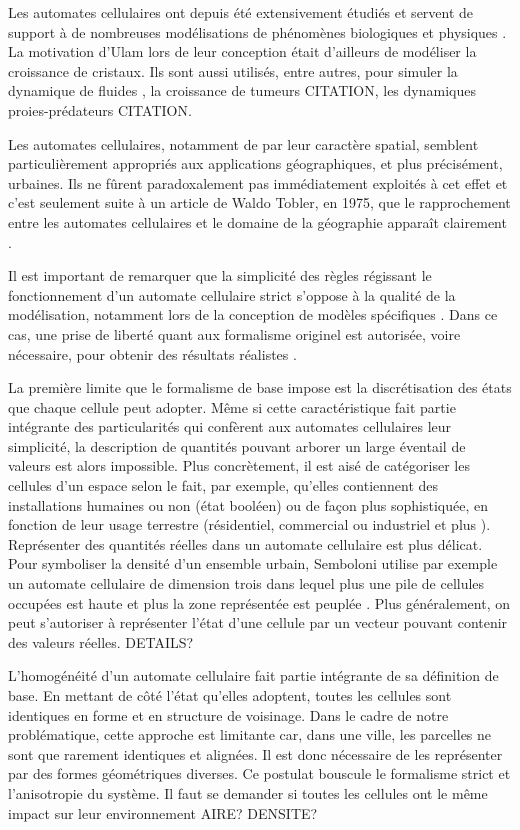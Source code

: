 \documentclass[10pt]{article}
\begin{document}
\begin{multicols}{2}
Les automates cellulaires ont depuis été extensivement étudiés et
servent de support à de nombreuses modélisations de phénomènes
biologiques et physiques \cite{Ganguly}. La motivation d'Ulam lors de
leur conception était d'ailleurs de modéliser la croissance de
cristaux. Ils sont aussi utilisés, entre autres, pour simuler la
dynamique de fluides \cite{Frisch1986}, la croissance de tumeurs
CITATION, les dynamiques proies-prédateurs CITATION.

Les automates cellulaires, notamment de par leur caractère spatial,
semblent particulièrement appropriés aux applications géographiques,
et plus précisément, urbaines. Ils ne fûrent paradoxalement pas
immédiatement exploités à cet effet et c'est seulement suite à un
article de Waldo Tobler, en 1975, que le rapprochement entre les
automates cellulaires et le domaine de la géographie apparaît
clairement \cite{Tobler1975}.

Il est important de remarquer que la simplicité des règles régissant
le fonctionnement d'un automate cellulaire strict s'oppose à la
qualité de la modélisation, notamment lors de la conception de modèles
spécifiques \cite{Torrens2001}. Dans ce cas, une prise de liberté
quant aux formalisme originel est autorisée, voire nécessaire, pour
obtenir des résultats réalistes \cite{White1998}.

La première limite que le formalisme de base impose est la
discrétisation des états que chaque cellule peut adopter. Même si
cette caractéristique fait partie intégrante des particularités qui
confèrent aux automates cellulaires leur simplicité, la description de
quantités pouvant arborer un large éventail de valeurs est alors
impossible. Plus concrètement, il est aisé de catégoriser les cellules
d'un espace selon le fait, par exemple, qu'elles contiennent des
installations humaines ou non (état booléen)
\cite{Benguigui2004,Cornu} ou de façon plus sophistiquée, en fonction
de leur usage terrestre (résidentiel, commercial ou industriel
\cite{Lechner} et plus \cite{Dubos-Paillard203}). Représenter des
quantités réelles dans un automate cellulaire est plus délicat. Pour
symboliser la densité d'un ensemble urbain, Semboloni utilise par
exemple un automate cellulaire de dimension trois dans lequel plus une
pile de cellules occupées est haute et plus la zone représentée est
peuplée \cite{Semboloni2000}. Plus généralement, on peut s'autoriser à
représenter l'état d'une cellule par un vecteur pouvant contenir des
valeurs réelles. DETAILS?

L'homogénéité d'un automate cellulaire fait partie intégrante de sa
définition de base. En mettant de côté l'état qu'elles adoptent,
toutes les cellules sont identiques en forme et en structure de
voisinage. Dans le cadre de notre problématique, cette approche est
limitante car, dans une ville, les parcelles ne sont que rarement
identiques et alignées. Il est donc nécessaire de les représenter par
des formes géométriques diverses. Ce postulat bouscule le formalisme
strict et l'anisotropie du système. Il faut se demander si toutes les
cellules ont le même impact sur leur environnement AIRE? DENSITE?


\end{multicols}
\end{document}
